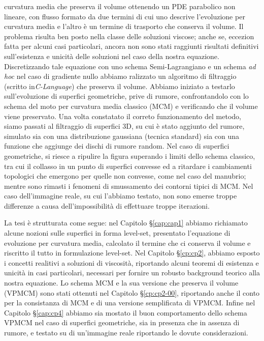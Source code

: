 curvatura media che preserva il volume ottenendo un PDE parabolico non
lineare, con  flusso formato da due termini di cui uno
descrive l'evoluzione  per curvatura media e l'altro è un termine di
trasporto che conserva il volume. Il problema risulta ben posto nella
classe  delle soluzioni viscose; anche se, eccezion
fatta per alcuni casi particolari, ancora non sono stati raggiunti
risultati definitivi sull'esistenza e unicità delle soluzioni nel caso
della nostra equazione. Discretizzando tale equazione con uno schema
Semi-Lagrangiano e un schema \emph{ad hoc} nel caso di gradiente 
nullo abbiamo ralizzato un algoritmo di filtraggio (scritto
in\emph{C-Language}) che preserva il volume. Abbiamo iniziato a
testarlo sull'evoluzione di superfici geometriche, prive di rumore,
confrontandolo con lo schema del moto
per curvatura media classico (MCM) e verificando che il volume viene
preservato. Una volta constatato il correto funzionamento del metodo,
siamo passati al filtraggio di superfici 3D, su cui è stato aggiunto
del rumore, simulato sia con una distribuzione gaussiana (tecnica
standard) sia con una funzione che aggiunge dei dischi di rumore
random. Nel caso di superfici geometriche, si riesce a ripulire la
figura superando i limiti dello schema classico, tra cui il collasso
in un punto di superfici convesse ed a ritardare i cambiamenti topologici che
emergono per quelle non convesse, come nel caso del manubrio; mentre
sono rimasti i fenomeni di smussamento dei contorni tipici di MCM.
Nel caso dell'immagine reale, su cui l'abbiamo testato, non sono
emerse troppe differenze a causa dell'impossibilità di effettuare troppe
iterazioni.
 
La tesi è strutturata come segue: nel Capitolo §\ref{cap:cap1} abbiamo
richiamato alcune nozioni sulle superfici in forma level-set,
presentato l'equazione di evoluzione per curvatura media, calcolato il
termine che ci conserva il volume e riscritto il tutto in formulazione
level-set. Nel Capitolo §\ref{cp:cp2}, abbiamo esposto i concetti
realitivi a soluzioni di viscosità, riportando alcuni teoremi di
esistenza e unicità in casi particolari, necessari per fornire un
robusto background teorico alla nostra equazione. Lo schema MCM e la sua
versione che preserva il volume (VPMCM) sono stati ottenuti nel
Capitolo §\ref{cp:cp2-00}, riportando anche il conto per la
consistanza di MCM e di una versione semplificata di VPMCM. Infine nel
Capitolo §\ref{cap:cp4} abbiamo sia mostato il buon comportamento
dello schema VPMCM nel caso di superfici geometriche, sia in presenza
che in assenza di rumore, e testato su di un'immagine reale riportando le dovute considerazioni. 
   
